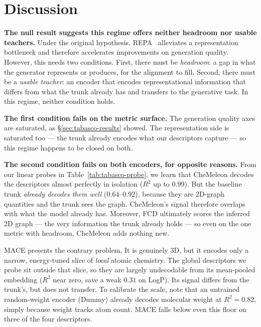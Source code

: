 \documentclass[12pt,a4paper,twoside]{report}
\begin{document}




\section{Discussion}
\label{sec:tabasco-diagnosis}

\textbf{The null result suggests this regime offers neither headroom nor usable teachers.} Under the original hypothesis, REPA~\cite{REPA} alleviates a representation bottleneck and therefore accelerates improvements on generation quality. However, this needs two conditions. First, there must be \emph{headroom}: a gap in what the generator represents or produces, for the alignment to fill. Second, there must be a \emph{usable teacher}: an encoder that encodes representational information that differs from what the trunk already has and transfers to the generative task. In this regime, neither condition holds.

\textbf{The first condition fails on the metric surface.} The generation quality axes are saturated, as \S\ref{sec:tabasco-results} showed. The representation side is saturated too --- the trunk already encodes what our descriptors capture --- so this regime happens to be closed on both.

\textbf{The second condition fails on both encoders, for opposite reasons.} From our linear probes in Table~\ref{tab:tabasco-probe}, we learn that CheMeleon decodes the descriptors almost perfectly in isolation ($R^2$ up to $0.99$). But the baseline trunk \emph{already decodes them well} ($0.64$--$0.92$), because they are 2D-graph quantities and the trunk sees the graph. CheMeleon's signal therefore overlaps with what the model already has. Moreover, FCD ultimately scores the inferred 2D graph --- the very information the trunk already holds --- so even on the one metric with headroom, CheMeleon adds nothing new.

MACE presents the contrary problem. It is genuinely 3D, but it encodes only a narrow, energy-tuned slice of \emph{local} atomic chemistry. The global descriptors we probe sit outside that slice, so they are largely undecodable from its mean-pooled embedding ($R^2$ near zero, save a weak $0.31$ on LogP). Its signal differs from the trunk's, but does not transfer. To calibrate the scale, note that an untrained random-weight encoder (Dummy) already decodes molecular weight at $R^2 = 0.82$, simply because weight tracks atom count. MACE falls below even this floor on three of the four descriptors.
\end{document}
